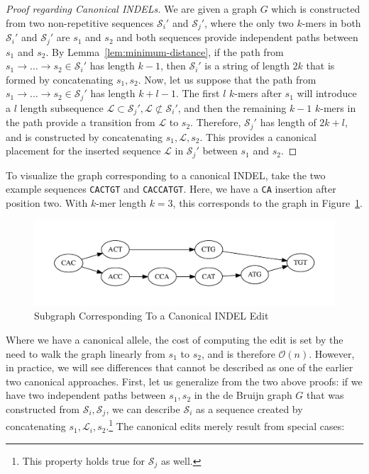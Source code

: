\documentclass{bioinfo}
\begin{document}
\begin{methods}
\begin{proof}[Proof regarding Canonical INDELs]
\label{proof:canonical-indels}
We are given a graph $G$ which is constructed from two non-repetitive sequences $\mathcal{S}_i'$ and
$\mathcal{S}_j'$, where the only two $k$-mers in both $\mathcal{S}_i'$ and $\mathcal{S}_j'$ are $s_1$
and $s_2$ and both sequences provide independent paths between $s_1$ and $s_2$. By
Lemma~\ref{lem:minimum-distance}, if the path from $s_1 \rightarrow \dots \rightarrow s_2 \in
\mathcal{S}_i'$ has length $k - 1$, then $\mathcal{S}_i'$ is a string of length $2k$ that is formed by
concatenating $s_1, s_2$. Now, let us suppose that the path from $s_1 \rightarrow \dots \rightarrow s_2
\in \mathcal{S}_j'$ has length $k + l - 1$. The first $l$ $k$-mers after $s_1$ will introduce a $l$ length
subsequence $\mathcal{L} \subset \mathcal{S}_j', \mathcal{L} \not\subset \mathcal{S}_i'$, and then the
remaining $k - 1$ $k$-mers in the path provide a transition from $\mathcal{L}$ to $s_2$. Therefore,
$\mathcal{S}_j'$ has length of $2k + l$, and is constructed by concatenating $s_1, \mathcal{L}, s_2$.
This provides a canonical placement for the inserted sequence $\mathcal{L}$ in $\mathcal{S}_j'$ between
$s_1$ and $s_2$.
\end{proof}

To visualize the graph corresponding to a canonical INDEL, take the two example sequences
\texttt{CACTGT} and \texttt{CACCATGT}. Here, we have a \texttt{CA} insertion after position two. With
$k$-mer length $k = 3$, this corresponds to the graph in Figure~\ref{fig:indel}.

\begin{figure}[h]
\begin{center}
\includegraphics[width=0.95\linewidth, clip=true, trim=0 39 0 39]{graphs/indel.pdf}
\end{center}
\caption{Subgraph Corresponding To a Canonical INDEL Edit}
\label{fig:indel}
\end{figure}

Where we have a canonical allele, the cost of computing the edit is set by the need to walk the graph
linearly from $s_1$ to $s_2$, and is therefore $\mathcal{O}(n)$. However, in practice, we will see
differences that cannot be described as one of the earlier two canonical approaches. First, let us
generalize from the two above proofs: if we have two independent paths between $s_1, s_2$ in the
de Bruijn graph $G$ that was constructed from $\mathcal{S}_i, \mathcal{S}_j$, we can describe
$\mathcal{S}_i$ as a sequence created by concatenating $s_1, \mathcal{L}_i, s_2$.\footnote{This
property holds true for $\mathcal{S}_j$ as well.} The canonical edits merely result from special cases:


\end{methods}
\end{document}
